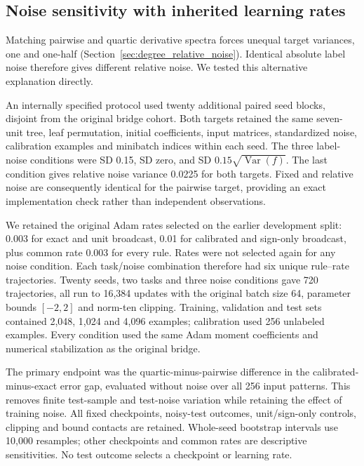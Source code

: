 \subsection{Noise sensitivity with inherited learning rates}
\label{sec:noise_sensitivity}

Matching pairwise and quartic derivative spectra forces unequal target
variances, one and one-half (Section~\ref{sec:degree_relative_noise}). Identical
absolute label noise therefore gives different relative noise. We tested
this alternative explanation directly.

An internally specified protocol used twenty additional paired
seed blocks, disjoint from the original bridge cohort. Both targets retained
the same seven-unit tree, leaf permutation, initial coefficients, input
matrices, standardized noise, calibration examples and minibatch indices
within each seed. The three label-noise conditions were SD 0.15,
SD zero, and SD $0.15\sqrt{\operatorname{Var}(f)}$. The last condition gives
relative noise variance 0.0225 for both targets. Fixed and relative noise
are consequently identical for the pairwise target, providing an exact
implementation check rather than independent observations.

We retained the original Adam rates selected on the earlier development
split: 0.003 for exact and unit broadcast, 0.01 for calibrated and sign-only
broadcast, plus common rate 0.003 for every rule. Rates were not selected
again for any noise condition. Each task/noise combination therefore had
six unique rule--rate trajectories. Twenty seeds, two tasks and three noise
conditions gave 720 trajectories, all run to 16,384 updates with the original
batch size 64, parameter bounds $[-2,2]$ and norm-ten clipping. Training,
validation and test sets contained 2,048, 1,024 and 4,096 examples;
calibration used 256 unlabeled examples. Every condition used the same Adam
moment coefficients and numerical stabilization as the original bridge.

The primary endpoint was the quartic-minus-pairwise difference in the
calibrated-minus-exact error gap, evaluated without noise over all 256 input
patterns. This removes finite test-sample and test-noise variation while
retaining the effect of training noise. All fixed checkpoints, noisy-test
outcomes, unit/sign-only controls, clipping and bound contacts are retained.
Whole-seed bootstrap intervals use 10,000 resamples; other checkpoints and
common rates are descriptive sensitivities. No test outcome selects a
checkpoint or learning rate.

